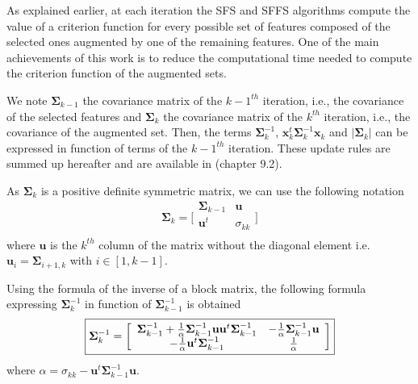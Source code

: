 \documentclass[a4paper]{article}
\begin{document}
        As explained earlier, at each iteration the SFS and SFFS algorithms compute the value of a criterion function for every possible set of features composed of the selected ones augmented by one of the remaining features. One of the main achievements of this work is to reduce the computational time needed to compute the criterion function of the augmented sets.

        We note $\boldsymbol{\Sigma}_{k-1}$ the covariance matrix of the $k-1^{th}$ iteration, i.e., the covariance of the selected features and $\boldsymbol{\Sigma}_{k}$ the covariance matrix of the $k^{th}$ iteration, i.e., the covariance of the augmented set. Then, the terms $\boldsymbol{\Sigma}_k^{-1}$, $\mathbf{x}_k^t \boldsymbol{\Sigma}_k^{-1} \mathbf{x}_k$ and $|\boldsymbol{\Sigma}_k|$ can be expressed in function of terms of the $k-1^{th}$ iteration. These update rules are summed up hereafter and are available in \cite{webb2003statistical} (chapter 9.2).

        As $\boldsymbol{\Sigma}_k$ is a positive definite symmetric matrix, we can use the following notation
        \begin{equation*}
            \boldsymbol{\Sigma}_k =
            \bigg[\begin{array}{cc}
            \boldsymbol{\Sigma}_{k-1} & \mathbf{u}      \\
            \mathbf{u}^t          & \sigma_{kk} \\
            \end{array}\bigg]
        \end{equation*}
        where $\mathbf{u}$ is the $k^{th}$ column of the matrix without the diagonal element i.e. $\mathbf{u}_{i} = \boldsymbol{\Sigma}_{i+1,k}$ with $i \in [1,k-1]$.

        Using the formula of the inverse of a block matrix, the following formula expressing $\boldsymbol{\Sigma}_k^{-1}$ in function of $\boldsymbol{\Sigma}_{k-1}^{-1}$ is obtained
        \begin{equation}
            \fbox{$
            \boldsymbol{\Sigma}_k^{-1} =
            \bigg[\begin{array}{cc}
            \boldsymbol{\Sigma}_{k-1}^{-1} + \frac{1}{\alpha} \boldsymbol{\Sigma}_{k-1}^{-1} \mathbf{u} \mathbf{u}^t \boldsymbol{\Sigma}_{k-1}^{-1} & - \frac{1}{\alpha} \boldsymbol{\Sigma}_{k-1}^{-1} \mathbf{u} \\
            - \frac{1}{\alpha} \mathbf{u}^t \boldsymbol{\Sigma}_{k-1}^{-1}                                                                          & \frac{1}{\alpha}                  \\
            \end{array}\bigg]
            $}
        \end{equation}
        where $ \alpha = \sigma_{kk} - \mathbf{u}^t \boldsymbol{\Sigma}_{k-1}^{-1} \mathbf{u} $.
\end{document}

